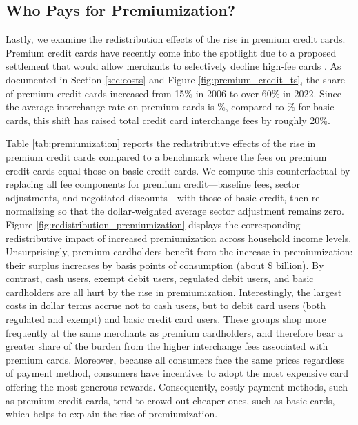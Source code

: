\documentclass[main.tex]{subfiles}
\begin{document}
\subsection{Who Pays for Premiumization?}

Lastly, we examine the redistribution effects of the rise in premium credit cards.
Premium credit cards have recently come into the spotlight due to a proposed settlement that would allow merchants to selectively decline high-fee cards \citep{Andriotis2025}.
As documented in Section \ref{sec:costs} and Figure \ref{fig:premium_credit_ts}, the share of premium credit cards increased from 15\% in 2006 to over 60\% in 2022.
Since the average interchange rate on premium cards is \%, compared to \% for basic cards, this shift has raised total credit card interchange fees by roughly 20\%.

Table \ref{tab:premiumization} reports the redistributive effects of the rise in premium credit cards compared to a benchmark where the fees on premium credit cards equal those on basic credit cards.
We compute this counterfactual by replacing all fee components for premium credit---baseline fees, sector adjustments, and negotiated discounts---with those of basic credit, then re-normalizing so that the dollar-weighted average sector adjustment remains zero.
Figure \ref{fig:redistribution_premiumization} displays the corresponding redistributive impact of increased premiumization across household income levels.
Unsurprisingly, premium cardholders benefit from the increase in premiumization: their surplus increases by  basis points of consumption (about \$ billion).
By contrast, cash users, exempt debit users, regulated debit users, and basic cardholders are all hurt by the rise in premiumization.
Interestingly, the largest costs in dollar terms accrue not to cash users, but to debit card users (both regulated and exempt) and basic credit card users.
These groups shop more frequently at the same merchants as premium cardholders, and therefore bear a greater share of the burden from the higher interchange fees associated with premium cards.
Moreover, because all consumers face the same prices regardless of payment method, consumers have incentives to adopt the most expensive card offering the most generous rewards.
Consequently, costly payment methods, such as premium credit cards, tend to crowd out cheaper ones, such as basic cards, which helps to explain the rise of premiumization.
\end{document}
